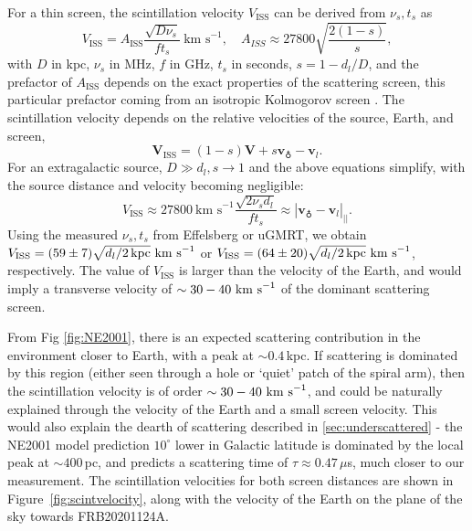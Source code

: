 \documentclass[fleqn,usenatbib]{mnras}
\newcommand{\frb}{FRB20201124A}
\begin{document}
For a thin screen, the scintillation velocity $V_\mathrm{ISS}$ can be derived from $\nu_{s}, t_{s}$ as
\vspace{-1.5mm}
\begin{equation}
V_\mathrm{ISS} = A_\mathrm{ISS} \frac{\sqrt{D \nu_{s} }}{f t_{s}}~\textrm{km~s}^{-1}, \quad  A_{ISS} \approx 27800 \sqrt{\frac{2(1-s)}{s}},
\end{equation}
with $D$ in kpc, $\nu_{s}$ in MHz, $f$ in GHz, $t_{s}$ in seconds,
$s = 1 - d_{l}/D$, and the prefactor of $A_\mathrm{ISS}$ depends on the exact properties of the scattering screen, this particular prefactor coming from an isotropic Kolmogorov screen \citep{cordes+98}.
The scintillation velocity depends on the relative velocities of the source, Earth, and screen,
\vspace{-1.5mm}
\begin{equation}
\textbf{V}_\mathrm{ISS} = (1-s) \textbf{V} + s \textbf{v}_{\earth} - \textbf{v}_{l}.
\end{equation}
For an extragalactic source, $D \gg d_{l}, s \rightarrow 1$ and the above equations simplify, with the source distance and velocity becoming negligible:
\vspace{-1.5mm}
\begin{equation}
    V_\mathrm{ISS} \approx 27800~\textrm{km~s}^{-1} \frac{\sqrt{2 \nu_{s} d_{l} }}{f t_{s}} \approx |\textbf{v}_{\earth} - \textbf{v}_{l}|_{||}.
\end{equation}
Using the measured $\nu_{s}, t_{s}$ from Effelsberg or uGMRT, we obtain $V_\mathrm{ISS} = (59\pm7) \sqrt{d_{l}/2\,\rm{kpc}}~{\rm km~s}^{-1}$ or $V_\mathrm{ISS} = (64\pm20) \sqrt{d_{l}/2\,\rm{kpc}}~{\rm km~s}^{-1}$, respectively.  The value of $V_\mathrm{ISS}$ is larger than the velocity of the Earth, and would imply a transverse velocity of $\sim30-40~{\rm km~s}^{-1}$ of the dominant scattering screen.  

From Fig \ref{fig:NE2001}, there is an expected scattering contribution in the environment closer to Earth, with a peak at $\sim 0.4\,$kpc.  If scattering is dominated by this region (either seen through a hole or `quiet' patch of the spiral arm), then the scintillation velocity is of order $\sim30-40~{\rm km~s}^{-1}$, and could be naturally explained through the velocity of the Earth and a small screen velocity.  This would also explain the dearth of scattering described in \ref{sec:underscattered} - the NE2001 model prediction $10^{\circ}$ lower in Galactic latitude is dominated by the local peak at $\sim400\,$pc, and predicts a scattering time of $\tau \approx 0.47\,\mu$s, much closer to our measurement.
The scintillation velocities for both screen distances are shown in Figure~\ref{fig:scintvelocity}, along with the velocity of the Earth on the plane of the sky towards \frb{}.
\end{document}
